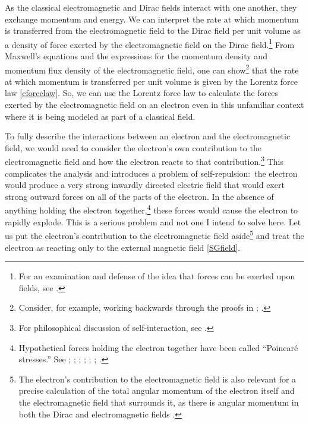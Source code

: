 \documentclass[12pt,secnumarabic,amsmath,amssymb,balancelastpage,nofootinbib]{article}
\begin{document}
As the classical electromagnetic and Dirac fields interact with one another, they exchange momentum and energy.  We can interpret the rate at which momentum is transferred from the electromagnetic field to the Dirac field per unit volume as a density of force exerted by the electromagnetic field on the Dirac field.\footnote{For an examination and defense of the idea that forces can be exerted upon fields, see \citet{forcesonfields}.}  From Maxwell's equations and the expressions for the momentum density and momentum flux density of the electromagnetic field, one can show\footnote{Consider, for example, working backwards through the proofs in \citet[sec.\ 6.7]{jackson}; \citet[sec.\ 8.2]{griffiths}.} that the rate at which momentum is transferred per unit volume is given by the Lorentz force law \eqref{cforcelaw}.  So, we can use the Lorentz force law to calculate the forces exerted by the electromagnetic field on an electron even in this unfamiliar context where it is being modeled as part of a classical field.

To fully describe the interactions between an electron and the electromagnetic field, we would need to consider the electron's own contribution to the electromagnetic field and how the electron reacts to that contribution.\footnote{For philosophical discussion of self-interaction, see \citet{lange, frisch2005, earman2011, lazarovici2018, maudlin2018, hartensteinhubert}.}  This complicates the analysis and introduces a problem of self-repulsion:\ the electron would produce a very strong inwardly directed electric field that would exert strong outward forces on all of the parts of the electron.  In the absence of anything holding the electron together,\footnote{Hypothetical forces holding the electron together have been called ``Poincar\'{e} stresses.''  See \citet[ch.\ 28]{feynman2}; \citet{rohrlich1973}; \citet{pearle1982}; \citet{schwinger1983electromagnetic}; \citet[ch.\ 16]{jackson}; \citet[sec.\ 6.3]{rohrlich}; \citet[sec.\ 5]{griffithsletter}.} these forces would cause the electron to rapidly explode.  This is a serious problem and not one I intend to solve here.  Let us put the electron's contribution to the electromagnetic field aside\footnote{The electron's contribution to the electromagnetic field is also relevant for a precise calculation of the total angular momentum of the electron itself and the electromagnetic field that surrounds it, as there is angular momentum in both the Dirac and electromagnetic fields \citep{howelectronsspin}.} and treat the electron as reacting only to the external magnetic field \eqref{SGfield}.
\end{document}
